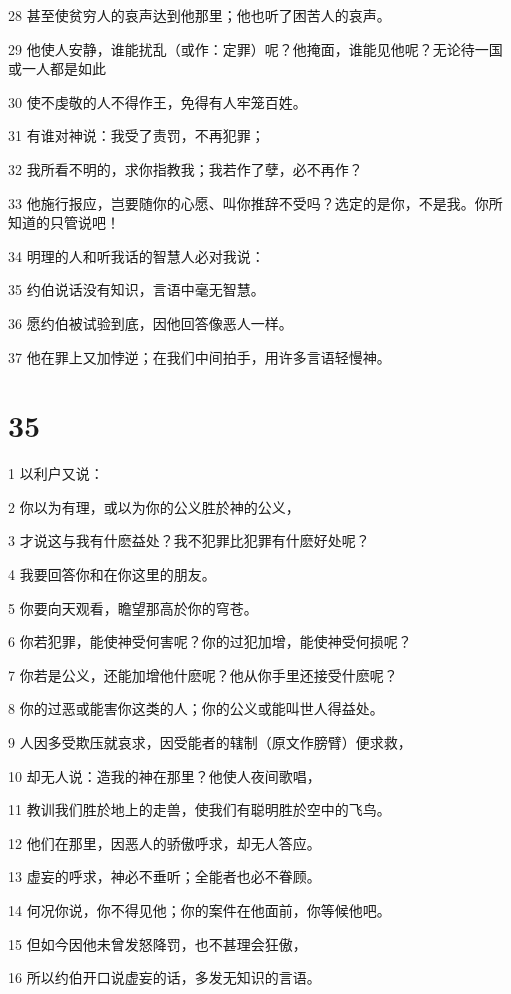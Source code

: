\par 28 甚至使贫穷人的哀声达到他那里；他也听了困苦人的哀声。
\par 29 他使人安静，谁能扰乱（或作：定罪）呢？他掩面，谁能见他呢？无论待一国或一人都是如此
\par 30 使不虔敬的人不得作王，免得有人牢笼百姓。
\par 31 有谁对神说：我受了责罚，不再犯罪；
\par 32 我所看不明的，求你指教我；我若作了孽，必不再作？
\par 33 他施行报应，岂要随你的心愿、叫你推辞不受吗？选定的是你，不是我。你所知道的只管说吧！
\par 34 明理的人和听我话的智慧人必对我说：
\par 35 约伯说话没有知识，言语中毫无智慧。
\par 36 愿约伯被试验到底，因他回答像恶人一样。
\par 37 他在罪上又加悖逆；在我们中间拍手，用许多言语轻慢神。

\chapter{35}

\par 1 以利户又说：
\par 2 你以为有理，或以为你的公义胜於神的公义，
\par 3 才说这与我有什麽益处？我不犯罪比犯罪有什麽好处呢？
\par 4 我要回答你和在你这里的朋友。
\par 5 你要向天观看，瞻望那高於你的穹苍。
\par 6 你若犯罪，能使神受何害呢？你的过犯加增，能使神受何损呢？
\par 7 你若是公义，还能加增他什麽呢？他从你手里还接受什麽呢？
\par 8 你的过恶或能害你这类的人；你的公义或能叫世人得益处。
\par 9 人因多受欺压就哀求，因受能者的辖制（原文作膀臂）便求救，
\par 10 却无人说：造我的神在那里？他使人夜间歌唱，
\par 11 教训我们胜於地上的走兽，使我们有聪明胜於空中的飞鸟。
\par 12 他们在那里，因恶人的骄傲呼求，却无人答应。
\par 13 虚妄的呼求，神必不垂听；全能者也必不眷顾。
\par 14 何况你说，你不得见他；你的案件在他面前，你等候他吧。
\par 15 但如今因他未曾发怒降罚，也不甚理会狂傲，
\par 16 所以约伯开口说虚妄的话，多发无知识的言语。

